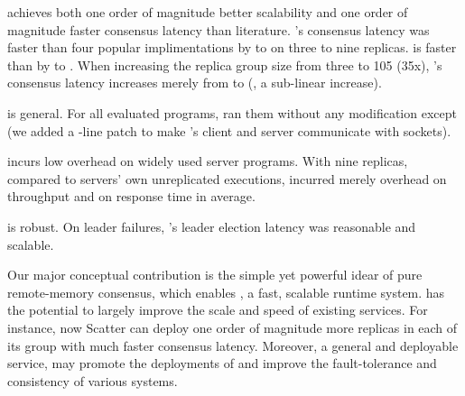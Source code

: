 \begin{tightenum}
\item \xxx achieves both one order of magnitude better scalability and one 
order of magnitude faster consensus latency than literature. \xxx's consensus 
latency was faster than four popular \paxos implimentations by \comptradlow to 
\comptradhigh on three to nine replicas. \xxx is faster than \dare by 
\fasterDARElow to \fasterDARE. When increasing the replica group size from 
three to 105 (35x), \xxx's consensus latency increases merely from 
\xxxlatencythree to \xxxlatencyonezerofive (\xxxscalability, a sub-linear 
increase).

\item \xxx is general. For all \nprog evaluated programs, \xxx ran them without 
any modification except \calvin (we added a \nlinescalvin-line patch to make 
\calvin's client and server communicate with sockets).

\item \xxx incurs low overhead on \nprog widely used server programs. 
With nine replicas, compared to servers' own unreplicated executions, \xxx 
incurred merely \tputoverhead overhead on throughput and \latencyoverhead on 
response time in average.

\item \xxx is robust. On \paxos leader failures, \xxx's leader election 
latency was reasonable and scalable.







\end{tightenum}  

Our major conceptual contribution is the simple yet powerful idear of pure 
remote-memory consensus, which enables \xxx, a fast, scalable \paxos runtime 
system. \xxx has the potential to largely improve the scale and speed of 
existing \paxos services. For instance, now Scatter can deploy one order of 
magnitude more replicas in each of its \paxos group with much faster consensus 
latency. Moreover, a general and deployable service, \xxx may promote the 
deployments of \paxos and improve the fault-tolerance and consistency of various 
systems.

